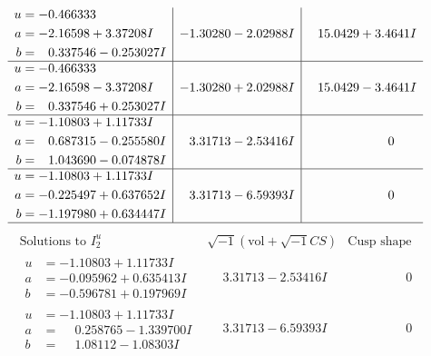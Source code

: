 \documentclass[1p]{elsarticle_modified}
\theoremstyle{definition}
\newcommand{\I}{\sqrt{-1}}
\begin{document}
$$\begin{array}{c|c|c}
\begin{aligned}
u &= -0.466333\phantom{ +0.000000I} \\
a &= -2.16598 + 3.37208 I \\
b &= \phantom{-}0.337546 - 0.253027 I\end{aligned}
 & -1.30280 - 2.02988 I & \phantom{-}15.0429 + 3.4641 I \\ \hline\begin{aligned}
u &= -0.466333\phantom{ +0.000000I} \\
a &= -2.16598 - 3.37208 I \\
b &= \phantom{-}0.337546 + 0.253027 I\end{aligned}
 & -1.30280 + 2.02988 I & \phantom{-}15.0429 - 3.4641 I \\ \hline\begin{aligned}
u &= -1.10803 + 1.11733 I \\
a &= \phantom{-}0.687315 - 0.255580 I \\
b &= \phantom{-}1.043690 - 0.074878 I\end{aligned}
 & \phantom{-}3.31713 - 2.53416 I & \phantom{-0.000000 } 0 \\ \hline\begin{aligned}
u &= -1.10803 + 1.11733 I \\
a &= -0.225497 + 0.637652 I \\
b &= -1.197980 + 0.634447 I\end{aligned}
 & \phantom{-}3.31713 - 6.59393 I & \phantom{-0.000000 } 0\\
 \hline 
 \end{array}$$\newpage$$\begin{array}{c|c|c}  
\text{Solutions to }I^u_{2}& \I (\text{vol} + \sqrt{-1}CS) & \text{Cusp shape}\\
 \hline 
\begin{aligned}
u &= -1.10803 + 1.11733 I \\
a &= -0.095962 + 0.635413 I \\
b &= -0.596781 + 0.197969 I\end{aligned}
 & \phantom{-}3.31713 - 2.53416 I & \phantom{-0.000000 } 0 \\ \hline\begin{aligned}
u &= -1.10803 + 1.11733 I \\
a &= \phantom{-}0.258765 - 1.339700 I \\
b &= \phantom{-}1.08112 - 1.08303 I\end{aligned}
 & \phantom{-}3.31713 - 6.59393 I & \phantom{-0.000000 } 0 \\ \hline\begin{aligned}

\end{aligned}
\end{array}$$
\end{document}
